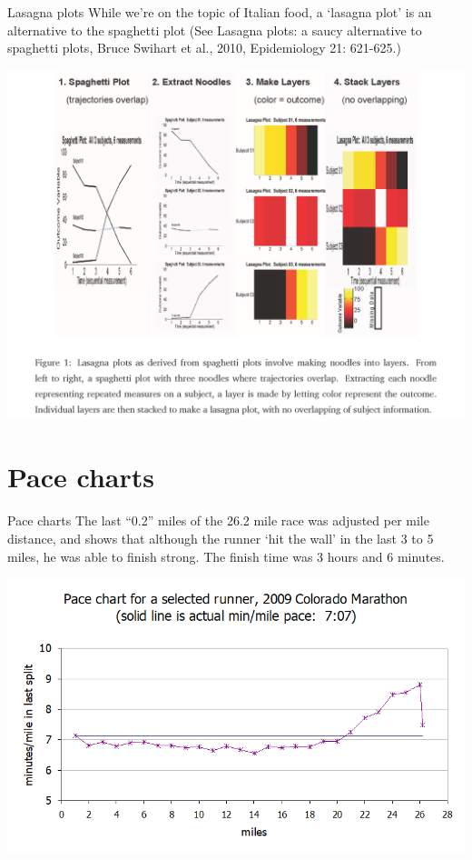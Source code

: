 \documentclass[
  9pt,
  ignorenonframetext,
]{beamer}
\begin{document}
\begin{frame}{Lasagna plots}
While we're on the topic of Italian food, a `lasagna plot' is an
alternative to the spaghetti plot (See Lasagna plots: a saucy
alternative to spaghetti plots, Bruce Swihart et al., 2010, Epidemiology
21: 621-625.) \tiny

\begin{center}\includegraphics[width=0.85\linewidth]{figs_L2/L2-f10} \end{center}

\tiny
\end{frame}

\hypertarget{pace-charts}{%
\section{Pace charts}\label{pace-charts}}

\begin{frame}{Pace charts}
The last ``0.2'' miles of the 26.2 mile race was adjusted per mile
distance, and shows that although the runner `hit the wall' in the last
3 to 5 miles, he was able to finish strong. The finish time was 3 hours
and 6 minutes.

\tiny

\begin{center}\includegraphics[width=0.6\linewidth]{figs_L2/L2-f11} \end{center}

\tiny
\end{frame}
\end{document}
